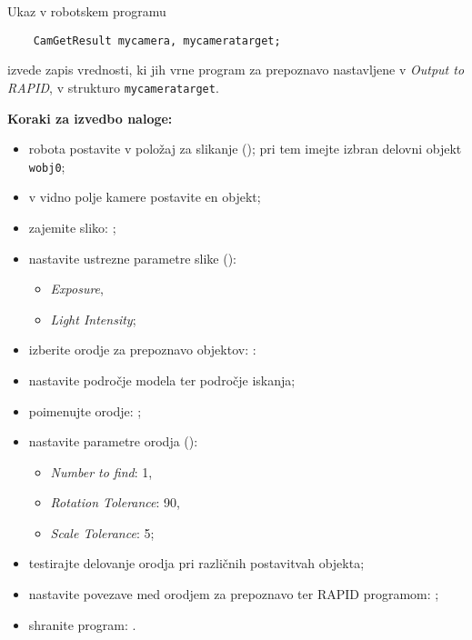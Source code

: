 

Ukaz v robotskem programu
\begin{verbatim}
	CamGetResult mycamera, mycameratarget;
\end{verbatim}
izvede zapis vrednosti, ki jih vrne program za prepoznavo nastavljene v \emph{Output to RAPID}, v strukturo \newline \verb"mycameratarget".


\vspace{5mm}

\begin{mdframed}[backgroundcolor=yellow!20, shadow=true,roundcorner=8pt]
	\textbf{Koraki za izvedbo naloge:}
	\begin{itemize}
		\item robota postavite v položaj za slikanje (); pri tem imejte izbran delovni objekt \verb"wobj0";
		\item v vidno polje kamere postavite en objekt;
		\item zajemite sliko: ;
		\item nastavite ustrezne parametre slike ():
		\begin{itemize}
			\item \emph{Exposure},
			\item \emph{Light Intensity};
		\end{itemize}
		\item izberite orodje za prepoznavo objektov: :
		\item nastavite področje modela ter področje iskanja;
		\item poimenujte orodje: ;
		\item nastavite parametre orodja ():
		\begin{itemize}
			\item \emph{Number to find}: 1,
			\item \emph{Rotation Tolerance}: 90,
			\item \emph{Scale Tolerance}: 5;
		\end{itemize}
		\item testirajte delovanje orodja pri različnih postavitvah objekta;
		\item nastavite povezave med orodjem za prepoznavo ter RAPID programom: ;
		\item shranite program: .
	\end{itemize}
\end{mdframed}



